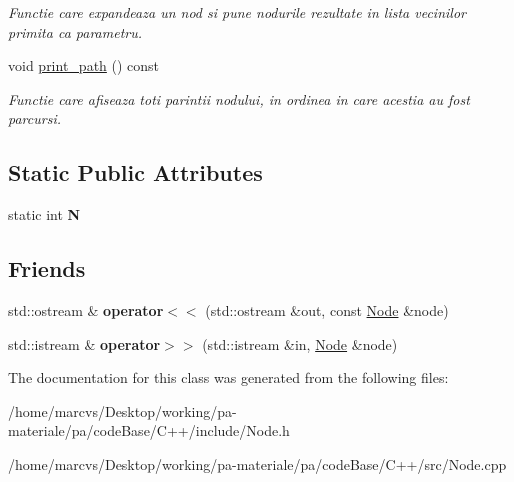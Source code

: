 \begin{DoxyCompactItemize}
\begin{DoxyCompactList}\small\item\em Functie care expandeaza un nod si pune nodurile rezultate in lista vecinilor primita ca parametru. \item\end{DoxyCompactList}\item 
\hypertarget{classNode_ad075488abbd00d3be0f3515839a6b47c}{
void \hyperlink{classNode_ad075488abbd00d3be0f3515839a6b47c}{print\_\-path} () const }
\label{classNode_ad075488abbd00d3be0f3515839a6b47c}

\begin{DoxyCompactList}\small\item\em Functie care afiseaza toti parintii nodului, in ordinea in care acestia au fost parcursi. \item\end{DoxyCompactList}\end{DoxyCompactItemize}
\subsection*{Static Public Attributes}
\begin{DoxyCompactItemize}
\item 
\hypertarget{classNode_acd052a324caaa2fa0ab5aff9ab0205f7}{
static int {\bfseries N}}
\label{classNode_acd052a324caaa2fa0ab5aff9ab0205f7}

\end{DoxyCompactItemize}
\subsection*{Friends}
\begin{DoxyCompactItemize}
\item 
\hypertarget{classNode_a8f66b39225eb98c6161e1339eb398e5e}{
std::ostream \& {\bfseries operator$<$$<$} (std::ostream \&out, const \hyperlink{classNode}{Node} \&node)}
\label{classNode_a8f66b39225eb98c6161e1339eb398e5e}

\item 
\hypertarget{classNode_aff91a3b012a8d4c18b2c7011e49d33b0}{
std::istream \& {\bfseries operator$>$$>$} (std::istream \&in, \hyperlink{classNode}{Node} \&node)}
\label{classNode_aff91a3b012a8d4c18b2c7011e49d33b0}

\end{DoxyCompactItemize}


The documentation for this class was generated from the following files:\begin{DoxyCompactItemize}
\item 
/home/marcvs/Desktop/working/pa-\/materiale/pa/codeBase/C++/include/Node.h\item 
/home/marcvs/Desktop/working/pa-\/materiale/pa/codeBase/C++/src/Node.cpp\end{DoxyCompactItemize}
